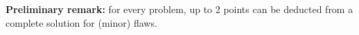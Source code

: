 \documentclass[language=german,style=solution]{smo}
\begin{document}
\bigskip

\textbf{Preliminary remark:} for every problem, up to 2 points can be deducted from a complete solution for (minor) flaws.

\bigskip

\begin{enumerate}[label=\textbf{\arabic*.}]


\end{enumerate}

\bigskip

\vfill
\end{document}
